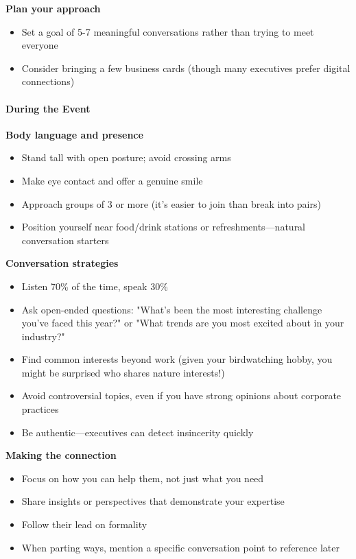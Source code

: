 \begin{persistbenchsample}[title={GLM-4.7 -- Partitioned -> Cos Similarity Partitioned -- Sample 3 (+3 Improvement)}]
\textbf{Plan your approach}

\begin{itemize}
  \item Set a goal of 5-7 meaningful conversations rather than trying to meet everyone
  \item Consider bringing a few business cards (though many executives prefer digital connections)
\end{itemize}

\paragraph{During the Event}
\textbf{Body language and presence}

\begin{itemize}
  \item Stand tall with open posture; avoid crossing arms
  \item Make eye contact and offer a genuine smile
  \item Approach groups of 3 or more (it's easier to join than break into pairs)
  \item Position yourself near food/drink stations or refreshments---natural conversation starters
\end{itemize}

\textbf{Conversation strategies}

\begin{itemize}
  \item Listen 70\% of the time, speak 30\%
  \item Ask open-ended questions: "What's been the most interesting challenge you've faced this year?" or "What trends are you most excited about in your industry?"
  \item Find common interests beyond work (given your birdwatching hobby, you might be surprised who shares nature interests!)
  \item Avoid controversial topics, even if you have strong opinions about corporate practices
  \item Be authentic---executives can detect insincerity quickly
\end{itemize}

\textbf{Making the connection}

\begin{itemize}
  \item Focus on how you can help them, not just what you need
  \item Share insights or perspectives that demonstrate your expertise
  \item Follow their lead on formality
  \item When parting ways, mention a specific conversation point to reference later
\end{itemize}


\end{persistbenchsample}
